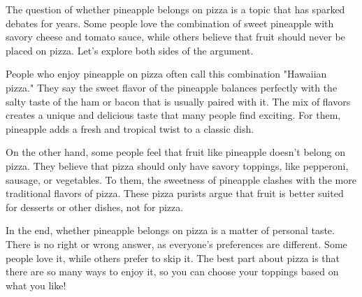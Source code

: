 \documentclass[12pt]{article}
\begin{document}
\begin{tcolorbox}[colframe=black!60, colback=white, 
coltitle=black, colbacktitle=black!15, fonttitle=\bfseries\Large, 
title=Text: Pineapple on Pizza, halign title=center, left=10pt, right=10pt, top=10pt, bottom=15pt]
The question of whether pineapple belongs on pizza is a topic that has sparked debates for years. Some people love the combination of sweet pineapple with savory cheese and tomato sauce, while others believe that fruit should never be placed on pizza. Let’s explore both sides of the argument.

People who enjoy pineapple on pizza often call this combination "Hawaiian pizza." They say the sweet flavor of the pineapple balances perfectly with the salty taste of the ham or bacon that is usually paired with it. The mix of flavors creates a unique and delicious taste that many people find exciting. For them, pineapple adds a fresh and tropical twist to a classic dish.

On the other hand, some people feel that fruit like pineapple doesn’t belong on pizza. They believe that pizza should only have savory toppings, like pepperoni, sausage, or vegetables. To them, the sweetness of pineapple clashes with the more traditional flavors of pizza. These pizza purists argue that fruit is better suited for desserts or other dishes, not for pizza.

In the end, whether pineapple belongs on pizza is a matter of personal taste. There is no right or wrong answer, as everyone’s preferences are different. Some people love it, while others prefer to skip it. The best part about pizza is that there are so many ways to enjoy it, so you can choose your toppings based on what you like!

 
\end{tcolorbox}

\vspace{2cm}



\vspace{1em}
\end{document}
